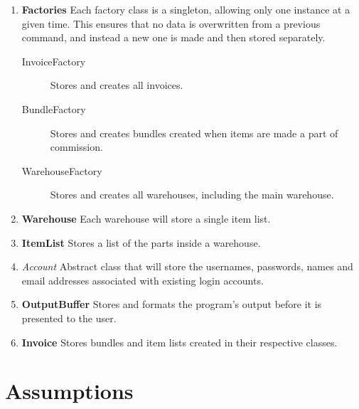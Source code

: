\documentclass{report}
\begin{document}
\begin{enumerate}
  \item \textbf{Factories} Each factory class is a singleton, allowing only one instance at a given time. This ensures that no data is overwritten from a previous command, and instead a new one is made and then stored separately.
    \begin{description}
      \item [InvoiceFactory] Stores and creates all invoices.
      \item [BundleFactory] Stores and creates bundles created when items are made a part of commission.
      \item [WarehouseFactory] Stores and creates all warehouses, including the main warehouse.
    \end{description}
  \item \textbf{Warehouse} Each warehouse will store a single item list.
  \item \textbf{ItemList} Stores a list of the parts inside a warehouse.
  \item \textit{Account} Abstract class that will store the usernames, passwords, names and email addresses associated with existing login accounts.
  \item \textbf{OutputBuffer} Stores and formats the program’s output before it is presented to the user.
  \item \textbf{Invoice} Stores bundles and item lists created in their respective classes.
\end{enumerate}

\section{Assumptions}
\end{document}
